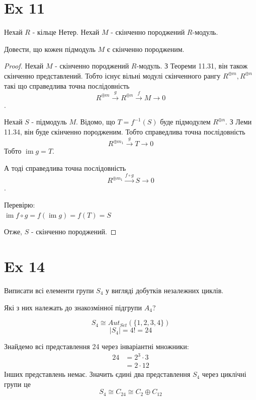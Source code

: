 \documentclass[11pt, a4paper]{article} %
\DeclareMathOperator{\im}{im}
\begin{document}
\section*{Ex 11}
\begin{mdframed}
    Нехай $R$ - кільце Нетер. Нехай $M$ - скінченно породжений $R$-модуль.

    Довести, що кожен підмодуль $M$ є скінченно породженим.
\end{mdframed}
\begin{proof}
    Нехай $M$ - скінченно породжений $R$-модуль. З Теореми 11.31, він також скінченно представлений.
    Тобто існує вільні модулі скінченного рангу $R^{\oplus m}, R^{\oplus n}$ 
    такі що справедлива точна послідовність 
    \[R^{\oplus m} \overset{g}{\longrightarrow} R^{\oplus n} \overset{f}{\longrightarrow} M \longrightarrow 0\].

    Нехай $S$ - підмодуль $M$.
    Відомо, що $T = f^{-1}(S)$ буде підмодулем $R^{\oplus n}$. 
    З Леми 11.34, він буде скінченно породженим.
    Тобто справедлива точна послідовність
    \[R^{\oplus m_1} \overset{g}{\longrightarrow} T \longrightarrow 0\]
    Тобто $\im g = T$.

    А тоді справедлива точна послідовність
    \[R^{\oplus m_1} \overset{f\circ g}{\longrightarrow} S \longrightarrow 0\].

    Перевірю:\\
    $\im f\circ g = f(\im g) = f(T) = S$

    Отже, $S$ - скінченно породжений.
\end{proof}


\section*{Ex 14}
\begin{mdframed}
    Виписати всі елементи групи $S_4$ у вигляді добутків незалежних циклів.

    Які з них належать до знакозмінної підгрупи $A_4$?
\end{mdframed}

\[S_4 \cong Aut_{Set}(\{1,2,3,4\})\]
\[|S_4| = 4! = 24\]

Знайдемо всі представлення 24 через інваріантні множники:\\
\begin{align*}
    24 &=  2^3\cdot 3 \\
    &= 2 \cdot 12 
\end{align*}
Інших представлень немає.
Значить єдині два представлення $S_4$ через циклічні групи це 
\[S_4 \cong C_{24} \cong C_{2} \oplus C_{12}\] 
\end{document}
